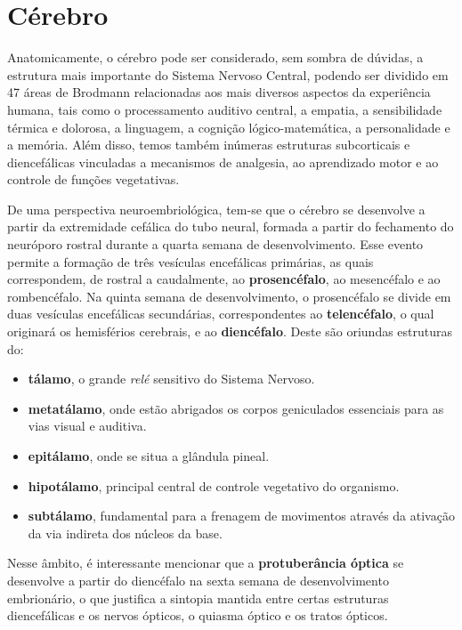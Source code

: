 \documentclass[
]{book}
\providecommand{\tightlist}{%
  \setlength{\itemsep}{0pt}\setlength{\parskip}{0pt}}
\theoremstyle{definition}
\theoremstyle{definition}
\theoremstyle{definition}
\theoremstyle{definition}
\theoremstyle{remark}
\begin{document}
\hypertarget{cuxe9rebro}{%
\chapter{Cérebro}\label{cuxe9rebro}}

Anatomicamente, o cérebro pode ser considerado, sem sombra de dúvidas, a estrutura mais importante do Sistema Nervoso Central, podendo ser dividido em 47 áreas de Brodmann relacionadas aos mais diversos aspectos da experiência humana, tais como o processamento auditivo central, a empatia, a sensibilidade térmica e dolorosa, a linguagem, a cognição lógico-matemática, a personalidade e a memória. Além disso, temos também inúmeras estruturas subcorticais e diencefálicas vinculadas a mecanismos de analgesia, ao aprendizado motor e ao controle de funções vegetativas.

De uma perspectiva neuroembriológica, tem-se que o cérebro se desenvolve a partir da extremidade cefálica do tubo neural, formada a partir do fechamento do neuróporo rostral durante a quarta semana de desenvolvimento. Esse evento permite a formação de três vesículas encefálicas primárias, as quais correspondem, de rostral a caudalmente, ao \textbf{prosencéfalo}, ao mesencéfalo e ao rombencéfalo. Na quinta semana de desenvolvimento, o prosencéfalo se divide em duas vesículas encefálicas secundárias, correspondentes ao \textbf{telencéfalo}, o qual originará os hemisférios cerebrais, e ao \textbf{diencéfalo}. Deste são oriundas estruturas do:

\begin{itemize}
\tightlist
\item
  \textbf{tálamo}, o grande \emph{relé} sensitivo do Sistema Nervoso.
\item
  \textbf{metatálamo}, onde estão abrigados os corpos geniculados essenciais para as vias visual e auditiva.
\item
  \textbf{epitálamo}, onde se situa a glândula pineal.
\item
  \textbf{hipotálamo}, principal central de controle vegetativo do organismo.
\item
  \textbf{subtálamo}, fundamental para a frenagem de movimentos através da ativação da via indireta dos núcleos da base.
\end{itemize}

Nesse âmbito, é interessante mencionar que a \textbf{protuberância óptica} se desenvolve a partir do diencéfalo na sexta semana de desenvolvimento embrionário, o que justifica a sintopia mantida entre certas estruturas diencefálicas e os nervos ópticos, o quiasma óptico e os tratos ópticos.
\end{document}
